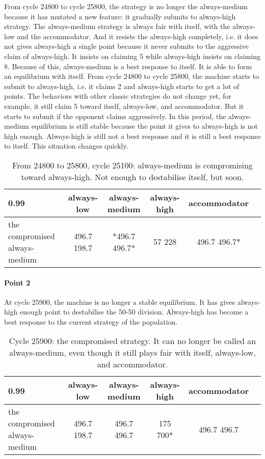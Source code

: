 \documentclass[12.5pt]{report}
\begin{document}
From cycle 24800 to cycle 25800, the strategy is no longer the always-medium because it has mutated a new feature: it gradually submits to always-high strategy. The always-medium strategy is always fair with itself, with the always-low and the accommodator. And it resists the always-high completely, i.e. it does not gives always-high a single point because it never submits to the aggressive claim of always-high. It insists on claiming 5 while always-high insists on claiming 8. Because of this, always-medium is a best response to itself. It is able to form an equilibrium with itself. From cycle 24800 to cycle 25800, the machine starts to submit to always-high, i.e. it claims 2 and always-high starts to get a lot of points. The behaviors with other classic strategies do not change yet, for example, it still claim 5 toward itself, always-low, and accommodator. But it starts to submit if the opponent claims aggressively. In this period, the always-medium equilibrium is still stable because the point it gives to always-high is not high enough. Always-high is still not a best response and it is still a best response to itself. This situation changes quickly.

\begin{table}[h!]
\center
\begin{tabular}{l|ccccc}
\textbf{0.99}& always-low & always-medium & always-high & accommodator\\
\hline
the compromised always-medium  &  496.7 198.7 &  *496.7 496.7*   &    57 228   &     496.7 496.7* \\
\end{tabular}
\caption{From 24800 to 25800, cycle 25100: always-medium is compromising toward always-high. Not enough to destabilise itself, but soon.}
\end{table}



\paragraph{Point 2}


At cycle 25900, the machine is no longer a stable equilibrium. It has gives always-high enough point to destabilise the 50-50 division. Always-high has become a best response to the current strategy of the population.

\begin{table}[h!]
\center
\begin{tabular}{l|ccccc}
\textbf{0.99}& always-low & always-medium & always-high & accommodator\\
\hline
the compromised always-medium  &  496.7 198.7 &   496.7 496.7   &    175 700*   &     496.7 496.7 \\
\end{tabular}
\caption{Cycle 25900: the compromised strategy. It can no longer be called an always-medium, even though it still plays fair with itself, always-low, and accommodator.}
\end{table}
\end{document}
